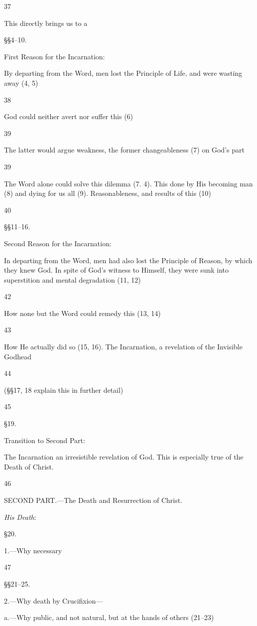 37

This directly brings us to a

§§4–10.

First Reason for the Incarnation:

By departing from the Word, men lost the Principle of Life, and were wasting away (4, 5)

38

God could neither avert nor suffer this (6)

39

The latter would argue weakness, the former changeableness (7) on God’s part

39

The Word alone could solve this dilemma (7. 4). This done by His becoming man (8) and dying for us all (9). Reasonableness, and results of this (10)

40

§§11–16.

Second Reason for the Incarnation:

In departing from the Word, men had also lost the Principle of Reason, by which they knew God. In spite of God’s witness to Himself, they were sunk into superstition and mental degradation (11, 12)

42

How none but the Word could remedy this (13, 14)

43

How He actually did so (15, 16). The Incarnation, a revelation of the Invisible Godhead

44

(§§17, 18 explain this in further detail)

45

§19.

Transition to Second Part:

The Incarnation an irresistible revelation of God. This is especially true of the Death of Christ.

46

SECOND PART.—The Death and Resurrection of Christ.

\emph{His Death}:

§20.

1.—Why necessary

47

§§21–25.

2.—Why death by Crucifixion—

a.—Why public, and not natural, but at the hands of others (21–23)

